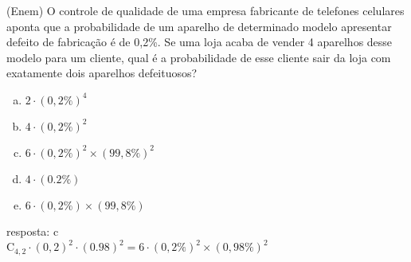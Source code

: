 \begin{ex}
(Enem) O controle de qualidade de uma empresa fabricante de telefones celulares aponta que a probabilidade de um aparelho de determinado modelo apresentar defeito de fabricação é de 0,2\%. Se uma loja acaba de vender 4 aparelhos desse modelo para um cliente, qual é a probabilidade de esse cliente sair da loja com exatamente dois aparelhos defeituosos?
   \begin{enumerate}[(a)]
   \item $2\cdot{(0,2\%)^4}$
   \item $4\cdot{(0,2\%)^2}$
   \item $6\cdot{(0,2\%)^2}\times {(99,8\%)^2}$
   \item $4\cdot{(0.2\%)}$
   \item $6\cdot(0,2\%)\times(99,8\%)$
   \end{enumerate}
     \begin{sol}
      resposta: c \\
      $\mathrm{C}_{4,2}\cdot(0,2)^2\cdot(0.98)^2=6\cdot(0,2\%)^2\times(0,98\%)^2$
     \end{sol}
\end{ex}